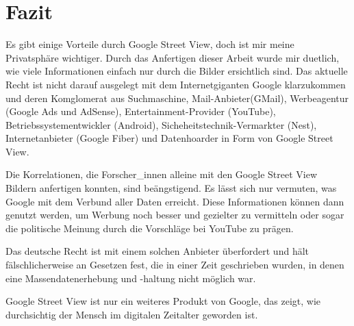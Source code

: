 \newpage

\section{Fazit} \label{fazit}

Es gibt einige Vorteile durch Google Street View, doch ist mir meine
Privatsphäre wichtiger. Durch das Anfertigen dieser Arbeit wurde mir duetlich,
wie viele Informationen einfach nur durch die Bilder ersichtlich sind. Das
aktuelle Recht ist nicht darauf ausgelegt mit dem Internetgiganten Google
klarzukommen und deren Komglomerat aus Suchmaschine, Mail-Anbieter(GMail),
Werbeagentur (Google Ads und AdSense), Entertainment-Provider (YouTube),
Betriebssystementwickler (Android), Sicheheitstechnik-Vermarkter (Nest),
Internetanbieter (Google Fiber) und Datenhoarder in Form von Google
Street View.

Die Korrelationen, die Forscher\_innen alleine mit den Google Street View Bildern
anfertigen konnten, sind beängstigend. Es lässt sich nur vermuten, was Google
mit dem Verbund aller Daten erreicht. Diese Informationen können dann genutzt
werden, um Werbung noch besser und gezielter zu vermitteln oder sogar die politische
Meinung durch die Vorschläge bei YouTube zu prägen.

Das deutsche Recht ist mit einem solchen Anbieter überfordert und hält
fälschlicherweise an Gesetzen fest, die in einer Zeit geschrieben wurden, in
denen eine Massendatenerhebung und -haltung nicht möglich war.

Google Street View ist nur ein weiteres Produkt von Google, das zeigt, wie
durchsichtig der Mensch im digitalen Zeitalter geworden ist.
